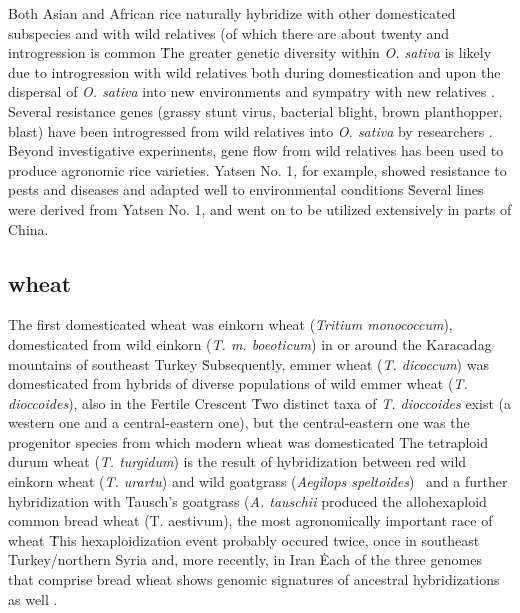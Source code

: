 \documentclass[11pt]{article}
\begin{document}
Both Asian and African rice naturally hybridize with other domesticated subspecies and with wild relatives (of which there are about twenty \cite{ricepedia} and introgression is common \cite{oka2012origin, second1982origin, zhao2010genomic}\.
The greater genetic diversity within \emph{O. sativa} is likely due to introgression with wild relatives both during domestication and upon the dispersal of \emph{O. sativa} into new environments and sympatry with new relatives \cite{second1982origin}.
Several resistance genes (grassy stunt virus, bacterial blight, brown planthopper, blast) have been introgressed from wild relatives into \emph{O. sativa} by researchers \cite{brar1997alien, khush1974inheritance}.
Beyond investigative experiments, gene flow from wild relatives has been used to produce agronomic rice varieties.
Yatsen No. 1, for example, showed resistance to pests and diseases and adapted well to environmental conditions \cite{ting1933wild}\.
Several lines were derived from Yatsen No. 1, and went on to be utilized extensively in parts of China.










\subsection*{wheat}

The first domesticated wheat was einkorn wheat (\emph{Tritium monococcum}), domesticated from wild einkorn (\emph{T. m. boeoticum}) in or around the Karacadag mountains of southeast Turkey \cite{heun1997site, harlan1966distribution, ozkan2002aflp}\.
Subsequently, emmer wheat (\emph{T. dicoccum}) was domesticated from hybrids of diverse populations of wild emmer wheat (\emph{T. dioccoides}), also in the Fertile Crescent \cite{lev2000cradle, civavn2013reticulated, luo2007structure, ozkan2002aflp}\.
Two distinct taxa of \emph{T. dioccoides} exist (a western one and a central-eastern one), but the central-eastern one was the progenitor species from which modern wheat was domesticated \cite{ozkan2005reconsideration}
The tetraploid durum wheat (\emph{T. turgidum}) is the result of hybridization between red wild einkorn wheat (\emph{T. urartu}) and wild goatgrass (\emph{Aegilops speltoides}) \cite{mcfadden1946origin, petersen2006phylogenetic}\, and a further hybridization with Tausch's goatgrass (\emph{A. tauschii} produced the allohexaploid common bread wheat (T. aestivum), the most agronomically important race of wheat \cite{salamini2002genetics, hancock2012plant, dvorak2006molecular}\.
This hexaploidization event probably occured twice, once in southeast Turkey/northern Syria and, more recently, in Iran \cite{giles2006gludy}\.
Each of the three genomes that comprise bread wheat shows genomic signatures of ancestral hybridizations as well \cite{marcussen2014ancient}.
\end{document}
